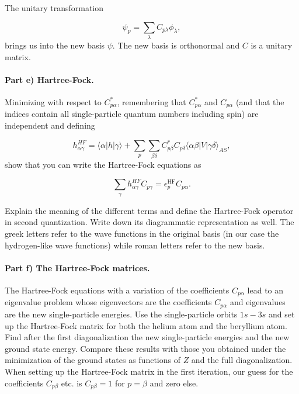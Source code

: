 \documentclass[%
oneside,                 %
final,                   %
10pt]{article}
\begin{document}
The unitary transformation

\begin{equation*}
\psi_p  = \sum_{\lambda} C_{p\lambda}\phi_{\lambda},
\end{equation*}
brings us into the new basis $\psi$.  The new basis is orthonormal and $C$ is a unitary matrix.

\paragraph{Part e) Hartree-Fock.}
Minimizing with respect to $C^*_{p\alpha}$, remembering that
$C^*_{p\alpha}$ and $C_{p\alpha}$ (and that the indices contain all
single-particle quantum numbers including spin) are independent and
defining

\begin{equation*}
h_{\alpha\gamma}^{HF}=\langle \alpha | h | \gamma \rangle+
\sum_{p}\sum_{\beta\delta} C^*_{p\beta}C_{p\delta}\langle \alpha\beta|V|\gamma\delta\rangle_{AS},
\end{equation*}
show that you can write the Hartree-Fock  equations as

\begin{equation*}
\sum_{\gamma}h_{\alpha\gamma}^{HF}C_{p\gamma}=\epsilon_p^{\mathrm{HF}}C_{p\alpha}.
\label{eq:newhf}
\end{equation*}

Explain the meaning of the different terms and define the Hartree-Fock
operator in second quantization. Write down its diagrammatic
representation as well.  The greek letters refer to the wave functions
in the original basis (in our case the hydrogen-like wave functions)
while roman letters refer to the new basis.

\paragraph{Part f) The Hartree-Fock matrices.}
The Hartree-Fock equations with a variation of the coefficients
$C_{p\alpha}$ lead to an eigenvalue problem whose eigenvectors are the
coefficients $C_{p\alpha}$ and eigenvalues are the new single-particle
energies.  Use the single-particle orbits $1s-3s$ and set up the
Hartree-Fock matrix for both the helium atom and the beryllium
atom. Find after the first diagonalization the new single-particle
energies and the new ground state energy.  Compare these results with
those you obtained under the minimization of the ground states as
functions of $Z$ and the full diagonalization. When setting up the
Hartree-Fock matrix in the first iteration, our guess for the
coefficients $C_{p\beta}$ etc. is $C_{p\beta}=1$ for $p=\beta$ and
zero else.
\end{document}
